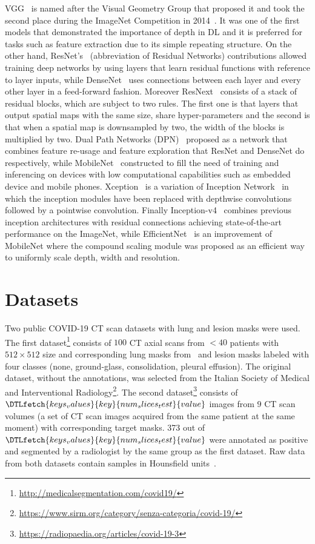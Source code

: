 \documentclass{elsarticle}
\begin{document}
VGG~\cite{simonyan2014very} is named after the Visual Geometry Group that proposed it and took the second place during the ImageNet Competition in 2014~\cite{deng2009imagenet}.
It was one of the first models that demonstrated the importance of depth in DL and it is preferred for tasks such as feature extraction due to its simple repeating structure.
On the other hand, ResNet's~\cite{he2016deep} (abbreviation of Residual Networks) contributions allowed training deep networks by using layers that learn residual functions with reference to layer inputs, while DenseNet~\cite{huang2017densely} uses connections between each layer and every other layer in a feed-forward fashion.
Moreover ResNext~\cite{xie2017aggregated} consists of a stack of residual blocks, which are subject to two rules.
The first one is that layers that output spatial maps with the same size, share hyper-parameters and the second is that when a spatial map is downsampled by two, the width of the blocks is multiplied by two.
Dual Path Networks (DPN)~\cite{chen2017dual} proposed as a network that combines feature re-usage and feature exploration that ResNet and DenseNet do respectively, while MobileNet~\cite{howard2017mobilenets} constructed to fill the need of training and inferencing on devices with low computational capabilities such as embedded device and mobile phones.
Xception~\cite{chollet2017xception} is a variation of Inception Network~\cite{szegedy2015going} in which the inception modules have been replaced with depthwise convolutions followed by a pointwise convolution.
Finally Inception-v4~\cite{szegedy2017inception} combines previous inception architectures with residual connections achieving state-of-the-art performance on the ImageNet, while EfficientNet~\cite{tan2019efficientnet} is an improvement of MobileNet where the compound scaling module was proposed as an efficient way to uniformly scale depth, width and resolution.

\section{Datasets}
\label{sec:datasets}
Two public COVID-19 CT scan datasets with lung and lesion masks were used.
The first dataset\footnote{\url{http://medicalsegmentation.com/covid19/}} consists of $100$ CT axial scans from $<40$ patients with $512\times 512$ size and corresponding lung masks from~\cite{hofmanninger2020automatic} and lesion masks labeled with four classes (none, ground-glass, consolidation, pleural effusion).
The original dataset, without the annotations, was selected from the Italian Society of Medical and Interventional Radiology\footnote{\url{https://www.sirm.org/category/senza-categoria/covid-19/}}.
The second dataset\footnote{\url{https://radiopaedia.org/articles/covid-19-3}} consists of $\DTLfetch{keys_values}{key}{num_slices_test}{value}$ images from $9$ CT scan volumes (a set of CT scan images acquired from the same patient at the same moment) with corresponding target masks.
373 out of $\DTLfetch{keys_values}{key}{num_slices_test}{value}$ were annotated as positive and segmented by a radiologist by the same group as the first dataset.
Raw data from both datasets contain samples in Hounsfield units~\cite{schneider1996calibration}.
\end{document}
